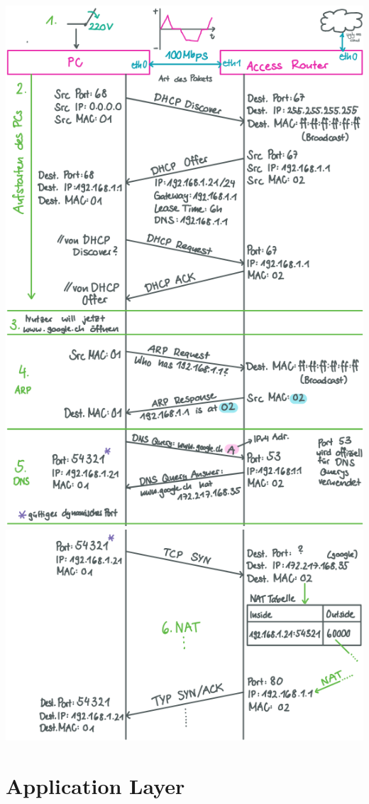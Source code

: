 \includegraphics[width=1\linewidth, height=1.2\linewidth]{images/atoz1.png}\\
\includegraphics[width=1\linewidth, height=0.5\linewidth]{images/atoz2.png}

\columnbreak

\section{Application Layer}


